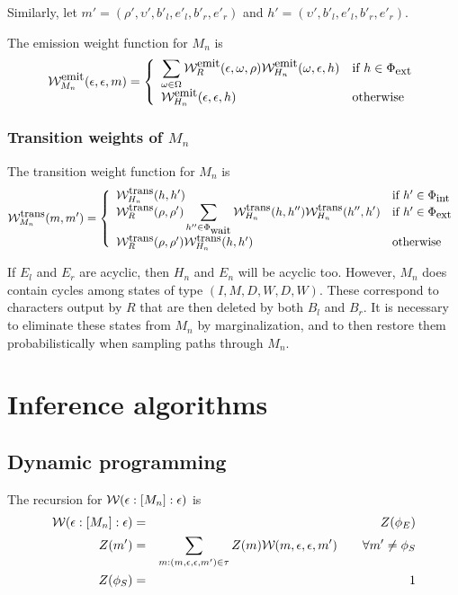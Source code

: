 \documentclass{article}
\newcommand\wtrans[4]{#1(#2 : [#3] : #4)}
\newcommand\States{\Phi}
\newcommand\statesof[1]{\States_{#1}}
\newcommand\Transitions{\tau}
\newcommand\startstate{\phi_S}
\newcommand\laststate{\phi_E}
\newcommand\weight{{\cal W}}
\newcommand\weightfunof[1]{\weight_{#1}}
\newcommand\transweightfun[1]{\weightfunof{#1}^{\mbox{\small trans}}}
\newcommand\emitweightfun[1]{\weightfunof{#1}^{\mbox{\small emit}}}
\newcommand\stateset[1]{\statesof{\mbox{\small #1}}}
\newcommand\hstatedest{(\upsilon',b'_l,e'_l,b'_r,e'_r)}
\newcommand\externalsuffix{ext}
\newcommand\internalsuffix{int}
\newcommand\waitsuffix{wait}
\newcommand\externalcascades{\stateset{\externalsuffix}}
\newcommand\internalcascades{\stateset{\internalsuffix}}
\newcommand\waitstates{\stateset{\waitsuffix}}
\newcommand\mstatedest{(\rho',\upsilon',b'_l,e'_l,b'_r,e'_r)}
\begin{document}
Similarly, let $m' = \mstatedest$ and $h' = \hstatedest$.

The emission weight function for $M_n$ is
\[
\emitweightfun{M_n}(\epsilon,\epsilon,m) = \left\{
\begin{array}{ll}
\displaystyle
\sum_{\omega \in \Omega} \emitweightfun{R}(\epsilon,\omega,\rho) \emitweightfun{H_n}(\omega,\epsilon,h)
 & \mbox{if $h \in \externalcascades$} \\
\emitweightfun{H_n}(\epsilon,\epsilon,h)
 & \mbox{otherwise}
\end{array}
\right.
\]

\subsubsection{Transition weights of $M_n$}
The transition weight function for $M_n$ is
\[
\transweightfun{M_n}(m,m') = \left\{
\begin{array}{ll}
\displaystyle
\transweightfun{H_n}(h,h')
 & \mbox{if $h' \in \internalcascades$} \\
\displaystyle
\transweightfun{R}(\rho,\rho') \sum_{h'' \in \waitstates} \transweightfun{H_n}(h,h'') \transweightfun{H_n}(h'',h')
 & \mbox{if $h' \in \externalcascades$} \\
\transweightfun{R}(\rho,\rho') \transweightfun{H_n}(h,h')
 & \mbox{otherwise}
\end{array}
\right.
\]

If $E_l$ and $E_r$ are acyclic, then $H_n$ and $E_n$ will be acyclic too.
However, $M_n$ does contain cycles among states of type $(I,M,D,W,D,W)$.
These correspond to characters output by $R$ that are then deleted by both $B_l$ and $B_r$.
It is necessary to eliminate these states from $M_n$ by marginalization, and to then restore them probabilistically when sampling paths through $M_n$.

\section{Inference algorithms}

\subsection{Dynamic programming}

The recursion for $\wtrans{\weight}{\epsilon}{M_n}{\epsilon}$ is
\begin{eqnarray*}
\wtrans{\weight}{\epsilon}{M_n}{\epsilon} & = & Z(\laststate) \\
Z(m') & = & \sum_{m : (m,\epsilon,\epsilon,m') \in \Transitions} Z(m) \weightfunof{}(m,\epsilon,\epsilon,m')  \quad\quad \forall m' \neq \startstate \\
Z(\startstate) & = & 1
\end{eqnarray*}
\end{document}
